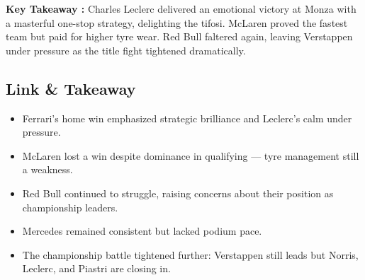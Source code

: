 \textbf{Key Takeaway :} Charles Leclerc delivered an emotional victory at Monza with a masterful one-stop strategy, delighting the tifosi. McLaren proved the fastest team but paid for higher tyre wear. Red Bull faltered again, leaving Verstappen under pressure as the title fight tightened dramatically.

\subsection{Link \& Takeaway}

\begin{itemize}
    \item Ferrari’s home win emphasized strategic brilliance and Leclerc’s calm under pressure. 
    \item McLaren lost a win despite dominance in qualifying — tyre management still a weakness. 
    \item Red Bull continued to struggle, raising concerns about their position as championship leaders. 
    \item Mercedes remained consistent but lacked podium pace.
    \item The championship battle tightened further: Verstappen still leads but Norris, Leclerc, and Piastri are closing in.
\end{itemize}
